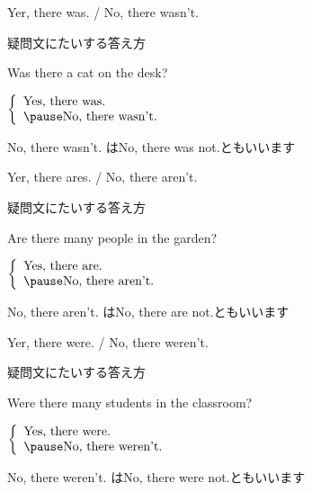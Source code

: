 \documentclass[aspectratio=169]{beamer}
\begin{document}
 \begin{frame}[plain]{Yer, there was. / No, there wasn't.}
 \Large

疑問文にたいする答え方
\vspace{10pt}

\pause
Was there a cat on the desk?

\pause

$\left\{\begin{array}{l}
	 \text{Yes, there was.}\\\pause
         \text{No, there wasn't.}
	\end{array}\right.$

\pause

\mbox{}\hfill{}{\small No, there wasn't. はNo, there was not.ともいいます}
\end{frame}

 \begin{frame}[plain]{Yer, there ares. / No, there aren't.}
 \Large

疑問文にたいする答え方
\vspace{10pt}

\pause

Are there many people in the garden?

\pause 

$\left\{\begin{array}{l}
	 \text{Yes, there are.}\\\pause
         \text{No, there aren't.}
	\end{array}\right.$

\pause

\mbox{}\hfill{}{\small No, there aren't. はNo, there are not.ともいいます}
\end{frame}

 \begin{frame}[plain]{Yer, there were. / No, there weren't.}
 \Large

疑問文にたいする答え方
\vspace{10pt}

\pause

Were there many students in the classroom?

\pause

$\left\{\begin{array}{l}
	 \text{Yes, there were.}\\\pause
         \text{No, there weren't.}
	\end{array}\right.$

\pause

\mbox{}\hfill{}{\small No, there weren't. はNo, there were not.ともいいます}
\end{frame}
\end{document}
